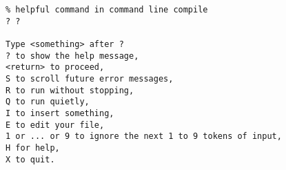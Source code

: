 \documentclass{article}
\begin{document}
\begin{verbatim}
% helpful command in command line compile
? ?

Type <something> after ?
? to show the help message,
<return> to proceed, 
S to scroll future error messages,
R to run without stopping, 
Q to run quietly,
I to insert something, 
E to edit your file,
1 or ... or 9 to ignore the next 1 to 9 tokens of input,
H for help, 
X to quit.
\end{verbatim}
\end{document}
